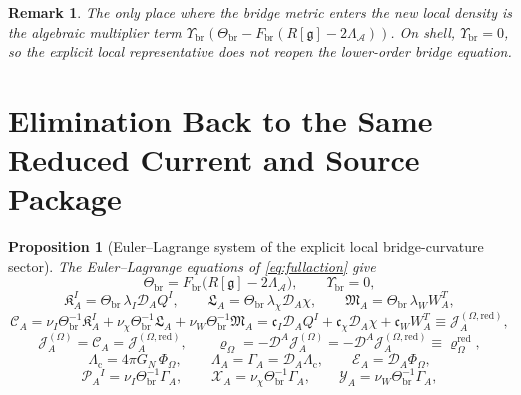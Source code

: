 \documentclass[11pt]{article}
\newcommand{\Sub}{\mathcal{A}}
\newcommand{\BridgeMetric}{\mathfrak g}
\newcommand{\SpatialD}{\mathcal D}
\newcommand{\FlowPot}{\Phi_\Omega}
\newcommand{\SourceDensity}{\varrho_\Omega}
\newcommand{\SourceDensityRed}{\varrho_\Omega^{\mathrm{red}}}
\newcommand{\SourceCurrent}{\mathcal J^{(\Omega)}}
\newcommand{\SourceCurrentRed}{\mathcal J^{(\Omega,\mathrm{red})}}
\newcommand{\ConstCurrent}{\mathcal C}
\newcommand{\ContMult}{\Lambda_{\mathrm c}}
\newcommand{\CurrentMult}{\Lambda}
\newcommand{\ConstGamma}{\Gamma}
\newcommand{\CurvQMult}{\mathscr P}
\newcommand{\CurvChiMult}{\mathscr X}
\newcommand{\CurvTransMult}{\mathscr Y}
\newcommand{\SourceFlux}{\mathcal E}
\newcommand{\CurvSeed}{\Theta_{\mathrm{br}}}
\newcommand{\CurvSeedMult}{\Upsilon_{\mathrm{br}}}
\newcommand{\CurvProfile}{F_{\mathrm{br}}}
\newcommand{\CurvOneI}{\mathfrak K}
\newcommand{\CurvOneChi}{\mathfrak L}
\newcommand{\CurvOneW}{\mathfrak M}
\newtheorem{proposition}{Proposition}
\newtheorem{remark}{Remark}
\begin{document}
\begin{remark}
The only place where the bridge metric enters the new local density is the algebraic multiplier term \(\CurvSeedMult(\CurvSeed-\CurvProfile(R[\BridgeMetric]-2\Lambda_{\Sub}))\). On shell, \(\CurvSeedMult=0\), so the explicit local representative does not reopen the lower-order bridge equation.
\end{remark}

\section{Elimination Back to the Same Reduced Current and Source Package}

\begin{proposition}[Euler--Lagrange system of the explicit local bridge-curvature sector]
\label{prop:EL}
The Euler--Lagrange equations of \eqref{eq:fullaction} give
\begin{equation}
\CurvSeed
=
\CurvProfile\!\bigl(R[\BridgeMetric]-2\Lambda_{\Sub}\bigr),
\qquad
\CurvSeedMult=0,
\label{eq:seedeqs}
\end{equation}
\begin{equation}
\CurvOneI_A^I=\CurvSeed\,\lambda_I\SpatialD_AQ^I,
\qquad
\CurvOneChi_A=\CurvSeed\,\lambda_\chi\SpatialD_A\chi,
\qquad
\CurvOneW_A=\CurvSeed\,\lambda_WW_A^T,
\label{eq:curvrels}
\end{equation}
\begin{equation}
\ConstCurrent_A
=
\nu_I\CurvSeed^{-1}\CurvOneI_A^I
+\nu_\chi\CurvSeed^{-1}\CurvOneChi_A
+\nu_W\CurvSeed^{-1}\CurvOneW_A
=
\mathfrak c_I\SpatialD_AQ^I
+\mathfrak c_\chi\SpatialD_A\chi
+\mathfrak c_WW_A^T
\equiv
\SourceCurrentRed_A,
\label{eq:constitutivecarrier}
\end{equation}
\begin{equation}
\SourceCurrent_A=\ConstCurrent_A=\SourceCurrentRed_A,
\qquad
\SourceDensity=-\SpatialD^A\SourceCurrent_A=-\SpatialD^A\SourceCurrentRed_A\equiv \SourceDensityRed,
\label{eq:currenteqs}
\end{equation}
\begin{equation}
\ContMult=4\pi G_N\,\FlowPot,
\qquad
\CurrentMult_A=\ConstGamma_A=\SpatialD_A\ContMult,
\qquad
\SourceFlux_A=\SpatialD_A\FlowPot,
\label{eq:multflux}
\end{equation}
\begin{equation}
\CurvQMult_A{}^{I}=\nu_I\CurvSeed^{-1}\ConstGamma_A,
\qquad
\CurvChiMult_A=\nu_\chi\CurvSeed^{-1}\ConstGamma_A,
\qquad
\CurvTransMult_A=\nu_W\CurvSeed^{-1}\ConstGamma_A,

\end{equation}
\end{proposition}
\end{document}
